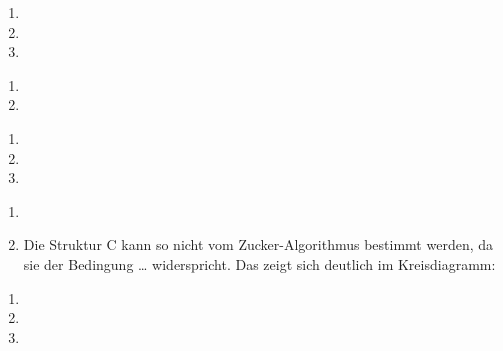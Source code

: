 \documentclass{homework}
\date{Montag, dem 14. Januar 2013}
\author{Stefan Meißner (4279113) und Niels Hoppe (4356370)}
\begin{document}
\maketitle
\begin{enumerate} 

\begin{enumerate}
\item
\item
\item
\end{enumerate}


\begin{enumerate}
\item
\item
\end{enumerate}

\begin{enumerate}
\item
\item
\item
\end{enumerate}

\begin{enumerate}
\item
\item
Die Struktur C kann so nicht vom Zucker-Algorithmus bestimmt werden,
da sie der Bedingung \ldots %
widerspricht. Das zeigt sich deutlich im Kreisdiagramm:

\end{enumerate}

\begin{enumerate}
\item
\item
\item
\end{enumerate}

\end{enumerate}
\end{document}
